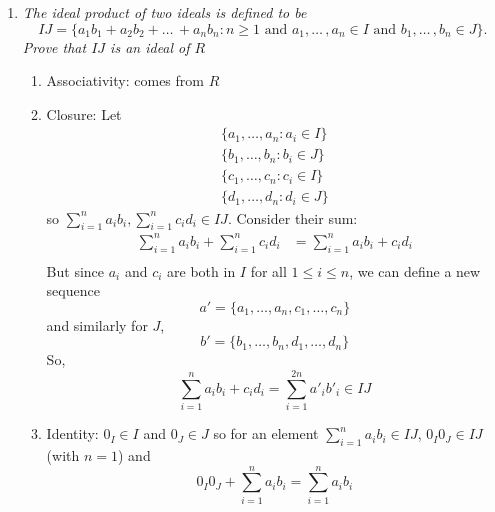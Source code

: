 \documentclass[12pt]{article}
\begin{document}
\begin{enumerate}[label=(\alph*)]
        \item \emph{The ideal product of two ideals is defined to be}
        \[ IJ = \{a_1b_1 + a_2b_2 + \dots\, + a_nb_n : n \geq 1 \text{ and } a_1, \dots\, , a_n \in I \text{ and } b_1, \dots\, , b_n \in J\}.\]
        \emph{Prove that $IJ$ is an ideal of $R$}
    
            \color{blue}
                \begin{enumerate}
                    \item Associativity: comes from $R$
                    
                    \item Closure: Let 
                    \begin{gather*}
                        \{a_1, \dots, a_n: a_i \in I\}\\
                        \{b_1, \dots, b_n: b_i \in J\}\\ 
                        \{c_1, \dots, c_n: c_i \in I\}\\
                        \{d_1, \dots, d_n: d_i \in J\}
                    \end{gather*} 
                    so $\sum_{i=1}^n a_i b_i, \sum_{i=1}^n c_i d_i \in IJ$. Consider their sum:
                    \begin{align*}
                        \sum_{i=1}^n a_i b_i + \sum_{i=1}^n c_i d_i &= \sum_{i=1}^n a_i b_i + c_i d_i\\
                    \end{align*}
                    But since $a_i$ and $c_i$ are both in $I$ for all $1 \leq i \leq n$, we can define a new sequence 
                    \[a' = \{a_1, \dots, a_n, c_1, \dots, c_n\}\]
                    and similarly for $J$, 
                    \[b' = \{b_1, \dots, b_n, d_1, \dots, d_n\}\]
                    So, 
                    \[\sum_{i=1}^n a_i b_i + c_i d_i = \sum_{i=1}^{2n} a'_ib'_i \in IJ\]

                    \item Identity: $0_I \in I$ and $0_J \in J$ so for an element $\sum_{i=1}^n a_i b_i \in IJ$, $0_I 0_J \in IJ$ (with $n = 1$) and 
                    \[0_I 0_J + \sum_{i=1}^n a_i b_i = \sum_{i=1}^n a_i b_i\]
                    

\end{enumerate}
\end{enumerate}
\end{document}
